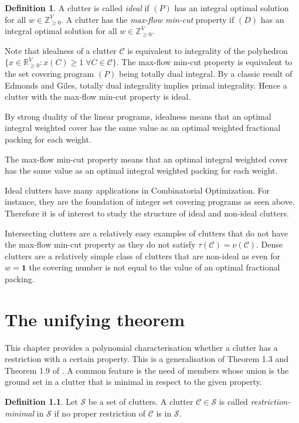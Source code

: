 \documentclass[a4paper, 12pt]{scrbook}
\theoremstyle{definition}
\newtheorem*{definition}{Definition}
\newcommand*{\IR}{\ensuremath{\mathbb{R}}}
\newcommand*{\IZ}{\ensuremath{\mathbb{Z}}}
\begin{document}
   \begin{definition}
       A clutter is called \emph{ideal} if $(P)$ has an integral optimal solution for all $w \in \IZ^V_{\geq 0}$. A clutter has the \emph{max-flow min-cut} property if $(D)$ has an integral optimal solution for all $w \in \IZ^V_{\geq 0}$.
   \end{definition}
   Note that idealness of a clutter $\mathcal{C}$ is equivalent to integrality of the polyhedron $\{x \in \IR^V_{\geq 0}: x(C) \geq 1 \; \forall C \in \mathcal{C}\}$.
   The max-flow min-cut property is equivalent to the set covering program $(P)$ being totally dual integral.
   By a classic result of Edmonds and Giles\cite{tdi}, totally dual integrality implies primal integrality.
   Hence a clutter with the max-flow min-cut property is ideal.

   By strong duality of the linear programs, idealness means that an optimal integral weighted cover has the same value as an optimal weighted fractional packing for each weight.

   The max-flow min-cut property means that an optimal integral weighted cover has the same value as an optimal integral weighted packing for each weight.

   Ideal clutters have many applications in Combinatorial Optimization. For instance, they are the foundation of integer set covering programs as seen above. Therefore it is of interest to study the structure of ideal and non-ideal clutters.

   Intersecting clutters are a relatively easy examples of clutters that do not have the max-flow min-cut property as they do not satisfy $\tau(\mathcal{C})=\nu(\mathcal{C})$. Dense clutters are a relatively simple class of clutters that are non-ideal as even for $w=\textbf{1}$ the covering number is not equal to the value of an optimal fractional packing.

\chapter{The unifying theorem}
This chapter provides a polynomial characterisation whether a clutter has a restriction with a certain property.
This is a generalisation of Theorem 1.3 and Theorem 1.9 of \cite{restrictions}.
A common feature is the need of members whose union is the ground set in a clutter that is minimal in respect to the given property.
   \begin{definition}
       Let $\mathcal{S}$ be a set of clutters.
       A clutter $\mathcal{C} \in \mathcal{S}$ is called \emph{restriction-minimal} in $\mathcal{S}$ if no proper restriction of $\mathcal{C}$ is in $\mathcal{S}$.
   \end{definition}
\end{document}
